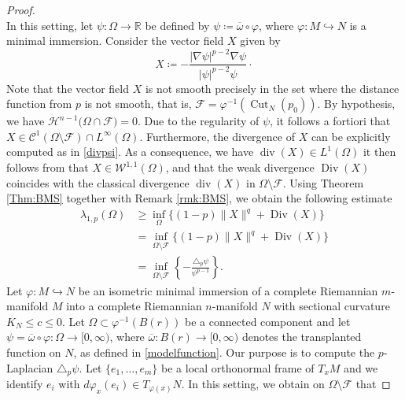 \documentclass{article}
\begin{document}
\begin{proof}
\begin{equation}
\end{equation}
In this setting, let $\psi \colon \Omega \to \mathbb{R}$ be defined by $\psi \coloneqq \overline{\omega} \circ \varphi$, where $\varphi:M \hookrightarrow N$ is a minimal immersion. Consider the vector field $X$ given by
\[ X \coloneqq - \frac{|\nabla \psi|^{p-2}\nabla \psi}{|\psi|^{p-2}\psi} \cdot \]
Note that the vector field $X$ is not smooth precisely in the set where the distance function from $p$ is not smooth, that is, $\mathcal{F} = \varphi^{-1}(\operatorname{Cut}_N(p_0))$. By hypothesis, we have $\mathcal{H}^{n-1}\bigl( \Omega \cap \mathcal{F} \bigr)=0$.
Due to the regularity of $\psi$, it follows a fortiori that $X \in \mathcal{C}^1(\Omega \setminus \mathcal{F}) \cap L^{\infty}(\Omega)$. Furthermore, the divergence of $X$ can be explicitly computed as in \eqref{divpsi}. As a consequence, we have $\operatorname{div}(X) \in L^{1}(\Omega)$ it then follows from \cite[Lemma 3.1]{BessaMontenegro} that $X \in \mathcal{W}^{1,1}(\Omega)$, and that the weak divergence $\operatorname{Div}(X)$ coincides with the classical divergence $\operatorname{div}(X)$ in $\Omega \setminus \mathcal{F}$.
Using Theorem \ref{Thm:BMS} together with Remark \ref{rmk:BMS}, we obtain the following estimate
\begin{equation}\label{pbartabessamontenegro}
\begin{aligned}
    \lambda_{1,p}(\Omega) &\geq \inf_{\Omega} \{ (1-p)\|X\|^q+\operatorname{Div}(X) \} \\
    &= \inf_{\Omega \setminus \mathcal{F}} \{ (1-p)\|X\|^q+\operatorname{Div}(X) \} \\
    &= \inf_{\Omega \setminus \mathcal{F}} \left\{ -\frac{\triangle_p \psi}{\psi^{p-1}}  \right\}.
    \end{aligned}
\end{equation}
Let $\varphi \colon M \hookrightarrow N$ be an isometric minimal immersion of a complete Riemannian $m$-manifold $M$ into a complete Riemannian $n$-manifold $N$ with sectional curvature $K_N \leq c \leq 0$. Let $\Omega \subset \varphi^{-1}(B(r))$ be a connected component and let $\psi = \overline{\omega} \circ \varphi \colon \Omega \to [0,\infty)$, where $\overline{\omega} \colon B(r) \to [0,\infty)$ denotes the transplanted function on $N$, as defined in \eqref{modelfunction}. Our purpose is to compute the $p$-Laplacian $\triangle_p \psi$. Let $\{e_1,\dots,e_m\}$ be a local orthonormal frame of $T_xM$ and we identify $e_i$ with $d\varphi_x(e_i)\in T_{\varphi(x)}N$. In this setting, we obtain on $\Omega\setminus\mathcal F$ that

\end{proof}
\end{document}
